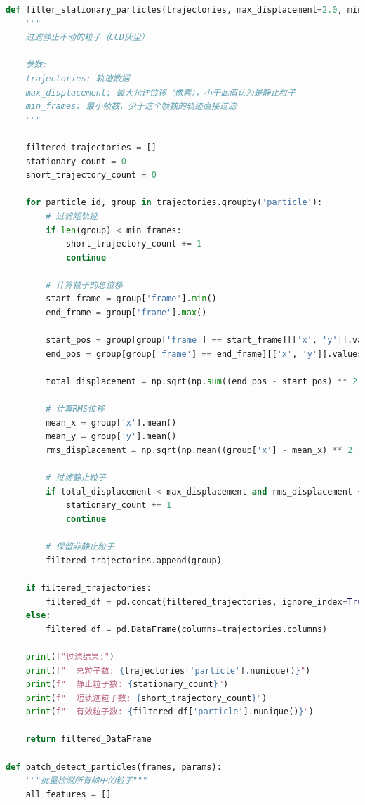 \documentclass[a4paper]{report} %
\begin{document}
\begin{lstlisting}[language=Python, caption=检测微球, label=code:searchforparticles]
def filter_stationary_particles(trajectories, max_displacement=2.0, min_frames=10):
    """
    过滤静止不动的粒子（CCD灰尘）
    
    参数:
    trajectories: 轨迹数据
    max_displacement: 最大允许位移（像素），小于此值认为是静止粒子
    min_frames: 最小帧数，少于这个帧数的轨迹直接过滤
    """
    
    filtered_trajectories = []
    stationary_count = 0
    short_trajectory_count = 0
    
    for particle_id, group in trajectories.groupby('particle'):
        # 过滤短轨迹
        if len(group) < min_frames:
            short_trajectory_count += 1
            continue
            
        # 计算粒子的总位移
        start_frame = group['frame'].min()
        end_frame = group['frame'].max()
        
        start_pos = group[group['frame'] == start_frame][['x', 'y']].values[0]
        end_pos = group[group['frame'] == end_frame][['x', 'y']].values[0]
        
        total_displacement = np.sqrt(np.sum((end_pos - start_pos) ** 2))
        
        # 计算RMS位移
        mean_x = group['x'].mean()
        mean_y = group['y'].mean()
        rms_displacement = np.sqrt(np.mean((group['x'] - mean_x) ** 2 + (group['y'] - mean_y) ** 2))
        
        # 过滤静止粒子
        if total_displacement < max_displacement and rms_displacement < max_displacement:
            stationary_count += 1
            continue
        
        # 保留非静止粒子
        filtered_trajectories.append(group)
    
    if filtered_trajectories:
        filtered_df = pd.concat(filtered_trajectories, ignore_index=True)
    else:
        filtered_df = pd.DataFrame(columns=trajectories.columns)
    
    print(f"过滤结果:")
    print(f"  总粒子数: {trajectories['particle'].nunique()}")
    print(f"  静止粒子数: {stationary_count}")
    print(f"  短轨迹粒子数: {short_trajectory_count}")
    print(f"  有效粒子数: {filtered_df['particle'].nunique()}")
    
    return filtered_DataFrame

def batch_detect_particles(frames, params):
    """批量检测所有帧中的粒子"""
    all_features = []
    

\end{lstlisting}
\end{document}
